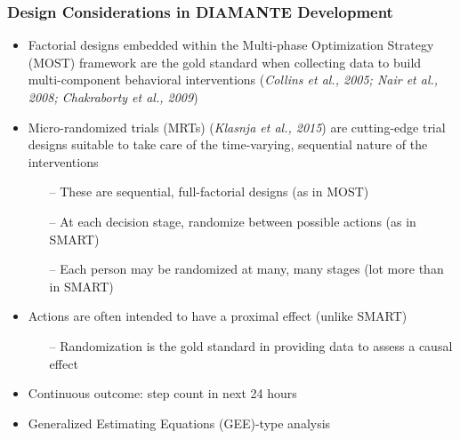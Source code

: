 \documentclass[10pt,xcolor=dvipsnames]{beamer}
\begin{document}



\begin{frame}%
\frametitle{Design Considerations in DIAMANTE Development}
\begin{itemize}
\item \alert{Factorial designs} embedded within the \alert{Multi-phase Optimization Strategy (MOST)} framework are the gold standard when collecting data to build multi-component behavioral interventions ({\em Collins et al., 2005; Nair et al., 2008; Chakraborty et al., 2009})
\bigskip
\item {\color{blue}Micro-randomized trials (MRTs)} ({\em Klasnja et al., 2015}) are cutting-edge trial designs suitable to take care of the time-varying, sequential nature of the interventions 
\smallskip
\begin{itemize}
\item[--] These are sequential, full-factorial designs (as in \alert{MOST})
\item[--] At each decision stage, randomize between possible actions (as in \alert{SMART})  
\item[--] Each person may be randomized at many, many stages (lot more than in \alert{SMART}) 
\end{itemize}
\bigskip
\item Actions are often intended to have a \alert{proximal effect} (unlike \alert{SMART})
\smallskip
\begin{itemize}
\item[--] Randomization is the gold standard in providing data to assess a causal effect
\end{itemize}
\bigskip
\item Continuous outcome: step count in next 24 hours
\bigskip
\item Generalized Estimating Equations (GEE)-type analysis
\end{itemize}
\end{frame}
\end{document}
